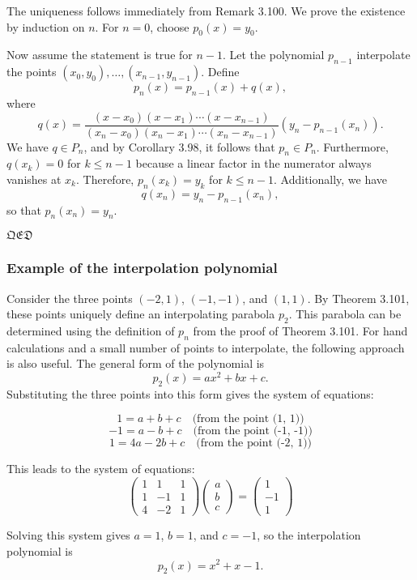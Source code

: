 The uniqueness follows immediately from Remark 3.100. We prove the existence by induction on $n$. For $n = 0$, choose $p_0(x) = y_0$. 

Now assume the statement is true for $n-1$. Let the polynomial $p_{n-1}$ interpolate the points $(x_0, y_0), \ldots, (x_{n-1}, y_{n-1})$. Define
\[
p_n(x) = p_{n-1}(x) + q(x),
\]
where
\[
q(x) = \frac{(x - x_0)(x - x_1)\cdots(x - x_{n-1})}{(x_n - x_0)(x_n - x_1)\cdots(x_n - x_{n-1})} (y_n - p_{n-1}(x_n)).
\]
We have $q \in P_n$, and by Corollary 3.98, it follows that $p_n \in P_n$. Furthermore, $q(x_k) = 0$ for $k \leq n-1$ because a linear factor in the numerator always vanishes at $x_k$. Therefore, $p_n(x_k) = y_k$ for $k \leq n-1$. Additionally, we have
\[
q(x_n) = y_n - p_{n-1}(x_n),
\]
so that $p_n(x_n) = y_n$. 

\noindent$\mathfrak{QED}$

\subsubsection{Example of the interpolation polynomial}

Consider the three points $(-2, 1)$, $(-1, -1)$, and $(1, 1)$. By Theorem 3.101, these points uniquely define an interpolating parabola $p_2$. This parabola can be determined using the definition of $p_n$ from the proof of Theorem 3.101. For hand calculations and a small number of points to interpolate, the following approach is also useful. The general form of the polynomial is 
\[
p_2(x) = ax^2 + bx + c.
\]
Substituting the three points into this form gives the system of equations:

\[
1 = a + b + c \quad \text{(from the point (1, 1))}
\]
\[
-1 = a - b + c \quad \text{(from the point (-1, -1))}
\]
\[
1 = 4a - 2b + c \quad \text{(from the point (-2, 1))}
\]

This leads to the system of equations:
\[
\begin{pmatrix}
1 & 1 & 1 \\
1 & -1 & 1 \\
4 & -2 & 1
\end{pmatrix}
\begin{pmatrix}
a \\
b \\
c
\end{pmatrix}
=
\begin{pmatrix}
1 \\
-1 \\
1
\end{pmatrix}
\]

Solving this system gives $a = 1$, $b = 1$, and $c = -1$, so the interpolation polynomial is
\[
p_2(x) = x^2 + x - 1.
\]

\newpage

